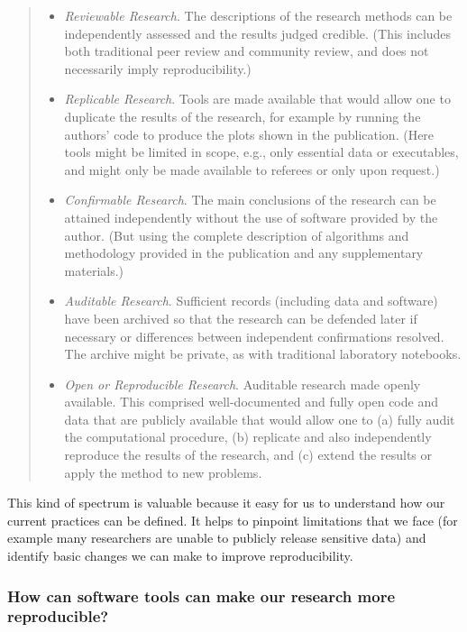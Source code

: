 \documentclass[
]{book}
\providecommand{\tightlist}{%
  \setlength{\itemsep}{0pt}\setlength{\parskip}{0pt}}
\begin{document}
\begin{quote}
\begin{itemize}
\tightlist
\item
  \emph{Reviewable Research}. The descriptions of the research methods can be independently assessed and the results judged credible. (This includes both traditional peer review and community review, and does not necessarily imply reproducibility.)
\item
  \emph{Replicable Research}. Tools are made available that would allow one to duplicate the results of the research, for example by running the authors' code to produce the plots shown in the publication. (Here tools might be limited in scope, e.g., only essential data or executables, and might only be made available to referees or only upon request.)
\item
  \emph{Confirmable Research}. The main conclusions of the research can be attained independently without the use of software provided by the author. (But using the complete description of algorithms and methodology provided in the publication and any supplementary materials.)
\item
  \emph{Auditable Research}. Sufficient records (including data and software) have been archived so that the research can be defended later if necessary or differences between independent confirmations resolved. The archive might be private, as with traditional laboratory notebooks.
\item
  \emph{Open or Reproducible Research}. Auditable research made openly available. This comprised well-documented and fully open code and data that are publicly available that would allow one to (a) fully audit the computational procedure, (b) replicate and also independently reproduce the results of the research, and (c) extend the results or apply the method to new problems.
\end{itemize}
\end{quote}

This kind of spectrum is valuable because it easy for us to understand how our current practices can be defined. It helps to pinpoint limitations that we face (for example many researchers are unable to publicly release sensitive data) and identify basic changes we can make to improve reproducibility.

\hypertarget{how-can-software-tools-can-make-our-research-more-reproducible}{%
\subsubsection{How can software tools can make our research more reproducible?}\label{how-can-software-tools-can-make-our-research-more-reproducible}}
\end{document}
